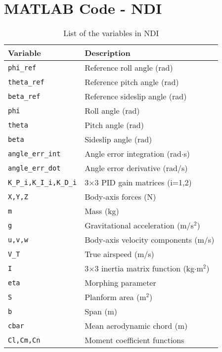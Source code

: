 \documentclass[a4paper, 12pt]{report}
\begin{document}
\chapter{MATLAB Code - NDI}

\begin{table}[h]
	\centering
	\begin{tabular}{ll}
		\toprule
		\textbf{Variable} & \textbf{Description} \\
		\midrule
		\verb+phi_ref+ & Reference roll angle (rad) \\
		\verb+theta_ref+ & Reference pitch angle (rad) \\
		\verb+beta_ref+ & Reference sideslip angle (rad) \\
		\verb+phi+ & Roll angle (rad) \\
		\verb+theta+ & Pitch angle (rad) \\
		\verb+beta+ & Sideslip angle (rad) \\
		\verb+angle_err_int+ & Angle error integration (rad$\cdot$s) \\
		\verb+angle_err_dot+ & Angle error derivative (rad/s) \\
		\verb+K_P_i,K_I_i,K_D_i+ & 3$\times$3 PID gain matrices (i=1,2) \\
		\verb+X,Y,Z+ & Body-axis forces (N) \\
		\verb+m+ & Mass (kg) \\
		\verb+g+ & Gravitational acceleration (m/s$^2$) \\
		\verb+u,v,w+ & Body-axis velocity components (m/s) \\
		\verb+V_T+ & True airspeed (m/s) \\
		\verb+I+ & 3$\times$3 inertia matrix function (kg$\cdot$m$^2$) \\
		\verb+eta+ & Morphing parameter \\
		\verb+S+ & Planform area (m$^2$) \\
		\verb+b+ & Span (m) \\
		\verb+cbar+ & Mean aerodynamic chord (m) \\
		\verb+Cl,Cm,Cn+ & Moment coefficient functions \\
		\bottomrule
	\end{tabular}
	\caption{List of the variables in NDI}
	\label{tab:ndi_variables}
\end{table}

\pagebreak
\end{document}
